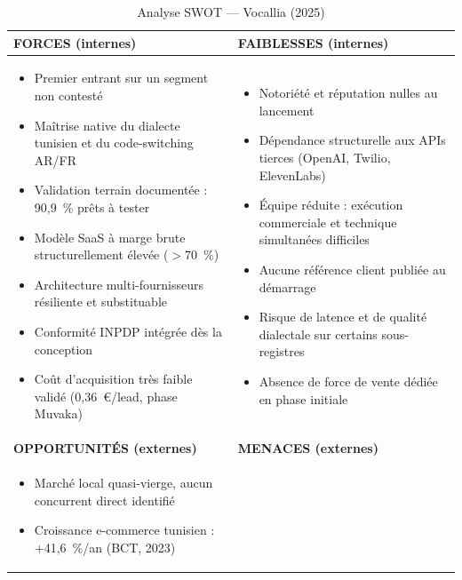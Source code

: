 \begin{table}[H]
\centering
\caption{Analyse SWOT --- Vocallia (2025)}
\vspace{4pt}
\begin{tabularx}{\textwidth}{|>{\raggedright\arraybackslash}X|>{\raggedright\arraybackslash}X|}
\hline
\textbf{FORCES (internes)} & \textbf{FAIBLESSES (internes)} \\
\hline
\begin{itemize}[leftmargin=*, noitemsep, topsep=3pt, parsep=0pt]
  \item Premier entrant sur un segment non contesté
  \item Maîtrise native du dialecte tunisien et du code-switching AR/FR
  \item Validation terrain documentée : 90,9~\% prêts à tester
  \item Modèle SaaS à marge brute structurellement élevée ($>$70~\%)
  \item Architecture multi-fournisseurs résiliente et substituable
  \item Conformité INPDP intégrée dès la conception
  \item Coût d'acquisition très faible validé (0,36~\euro{}/lead, phase Muvaka)
\end{itemize}
&
\begin{itemize}[leftmargin=*, noitemsep, topsep=3pt, parsep=0pt]
  \item Notoriété et réputation nulles au lancement
  \item Dépendance structurelle aux APIs tierces (OpenAI, Twilio, ElevenLabs)
  \item Équipe réduite : exécution commerciale et technique simultanées difficiles
  \item Aucune référence client publiée au démarrage
  \item Risque de latence et de qualité dialectale sur certains sous-registres
  \item Absence de force de vente dédiée en phase initiale
\end{itemize} \\
\hline
\textbf{OPPORTUNITÉS (externes)} & \textbf{MENACES (externes)} \\
\hline
\begin{itemize}[leftmargin=*, noitemsep, topsep=3pt, parsep=0pt]
  \item Marché local quasi-vierge, aucun concurrent direct identifié
  \item Croissance e-commerce tunisien : $+$41,6~\%/an (BCT, 2023)

\end{itemize}
\end{tabularx}
\end{table}
